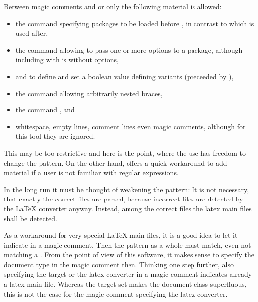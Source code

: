 Between magic comments and 
 or  
only the following material is allowed: 
%
\begin{itemize}
\item
the command  specifying packages to be loaded 
before , 
in contrast to  which is used after, 
\item
the command  
allowing to pass one or more options to a package, 
although including with  is without options, 
\item 
{} and  to define and set a boolean value 
defining variants (preceeded by ), 
\item 
the command  allowing arbitrarily nested braces, 
\item
the command , and 
\item
whitespace, empty lines, comment lines even magic comments, 
although for this tool they are ignored. 
\end{itemize}
%
This may be too restrictive and here is the point, 
where the use has freedom to change the pattern. 
On the other hand,  offers a quick workaround 
to add material if a user is not familiar with regular expressions. 

In the long run it must be thought of weakening the pattern: 
It is not necessary, that exactly the correct files are parsed, 
because incorrect files are detected by the \LaTeX{} converter anyway. 
Instead, among the correct files the latex main files shall be detected. 

As a workaround for very special \LaTeX{} main files, 
it is a good idea to let it indicate in a magic comment. 
Then the pattern as a whole must match, even not matching a . 
From the point of view of this software, 
it makes sense to specify the document type in the magic comment then. 
Thinking one step further, also specifying the target 
or the latex converter in a magic comment 
indicates already a latex main file. 
Whereas the target set makes the document class superfluous, 
this is not the case for the magic comment specifying the latex converter. 



